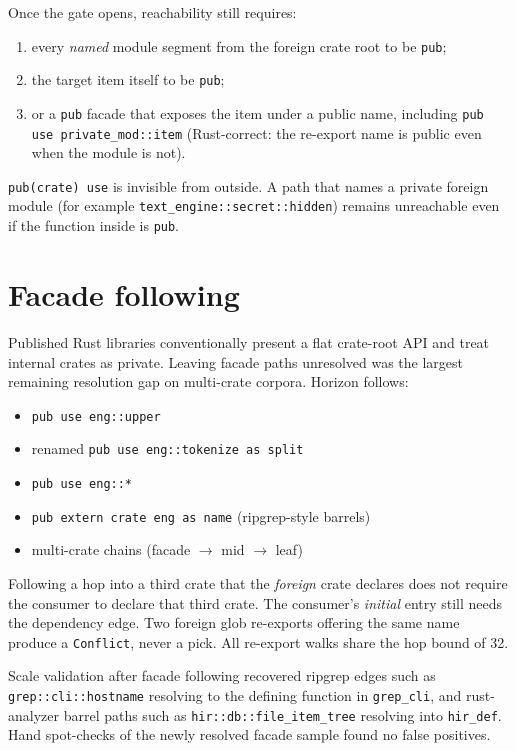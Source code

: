 \documentclass[11pt,a4paper,oneside]{report}
\newcommand{\horizon}{Horizon}
\begin{document}
Once the gate opens, reachability still requires:

\begin{enumerate}[nosep]
  \item every \emph{named} module segment from the foreign crate root to be
    \texttt{pub};
  \item the target item itself to be \texttt{pub};
  \item or a \texttt{pub} facade that exposes the item under a public name,
    including \texttt{pub use private\_mod::item} (Rust-correct: the
    re-export name is public even when the module is not).
\end{enumerate}

\texttt{pub(crate) use} is invisible from outside. A path that names a
private foreign module (for example \texttt{text\_engine::secret::hidden})
remains unreachable even if the function inside is \texttt{pub}.

\section{Facade following}

Published Rust libraries conventionally present a flat crate-root API and
treat internal crates as private. Leaving facade paths unresolved was the
largest remaining resolution gap on multi-crate corpora. \horizon{} follows:

\begin{itemize}[nosep]
  \item \texttt{pub use eng::upper}
  \item renamed \texttt{pub use eng::tokenize as split}
  \item \texttt{pub use eng::*}
  \item \texttt{pub extern crate eng as name} (ripgrep-style barrels)
  \item multi-crate chains (facade $\rightarrow$ mid $\rightarrow$ leaf)
\end{itemize}

Following a hop into a third crate that the \emph{foreign} crate declares does
not require the consumer to declare that third crate. The consumer's
\emph{initial} entry still needs the dependency edge. Two foreign glob
re-exports offering the same name produce a \texttt{Conflict}, never a pick.
All re-export walks share the hop bound of 32.

Scale validation after facade following recovered ripgrep edges such as
\texttt{grep::cli::hostname} resolving to the defining function in
\texttt{grep\_cli}, and rust-analyzer barrel paths such as
\texttt{hir::db::file\_item\_tree} resolving into \texttt{hir\_def}. Hand
spot-checks of the newly resolved facade sample found no false positives.
\end{document}
